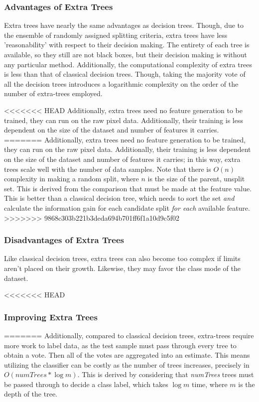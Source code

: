 \subsubsection{Advantages of Extra Trees}

Extra trees have nearly the same advantages as decision trees. Though, due to the ensemble of randomly assigned splitting criteria, extra trees have less 'reasonability' with respect to their decision making. The entirety of each tree is available, so they still are not black boxes, but their decision making is without any particular method. Additionally, the computational complexity of extra trees is less than that of classical decision trees. Though, taking the majority vote of all the decision trees introduces a logarithmic complexity on the order of the number of extra-trees employed. 

<<<<<<< HEAD
Additionally, extra trees need no feature generation to be trained, they can run on the raw pixel data. Additionally, their training is less dependent on the size of the dataset and number of features it carries.
=======
Additionally, extra trees need no feature generation to be trained, they can run on the raw pixel data. Additionally, their training is less dependent on the size of the dataset and number of features it carries; in this way, extra trees scale well with the number of data samples. Note that there is $O(n)$ complexity in making a random split, where $n$ is the size of the parent, unsplit set. This is derived from the comparison that must be made at the feature value. This is better than a classical decision tree, which needs to sort the set \emph{and} calculate the information gain for each candidate split \emph{for each} available feature. 
>>>>>>> 9868c303b221b3deda694b701ff6f1a10d9c5f02

\subsubsection{Disadvantages of Extra Trees}

Like classical decision trees, extra trees can also become too complex if limits aren't placed on their growth. Likewise, they may favor the class mode of the dataset. 

<<<<<<< HEAD
\subsubsection{Improving Extra Trees}


=======
Additionally, compared to classical decision trees, extra-trees require more work to label data, as the test sample must pass through every tree to obtain a vote. Then all of the votes are aggregated into an estimate. This means utilizing the classifier can be costly as the number of trees increases, precisely in $O(numTrees\ast \log m)$. This is derived by considering that \textit{numTrees} trees must be passed through to decide a class label, which takes $\log m$ time, where $m$ is the depth of the tree.

